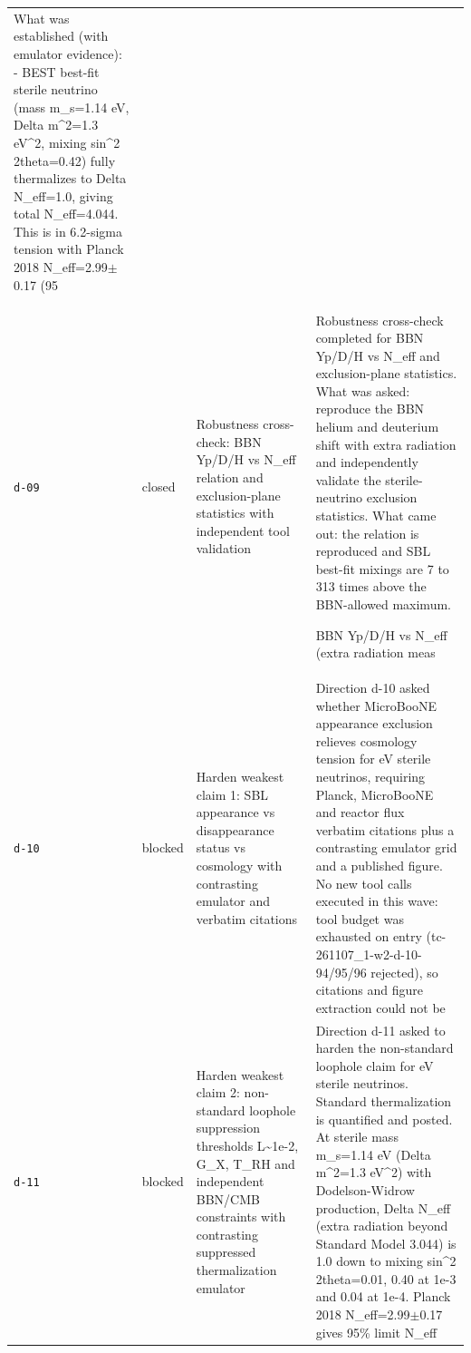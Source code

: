 \documentclass[11pt,a4paper]{article}
\begin{document}
\begin{longtable}{@{}p{}p{}p{}p{}@{}}
What was established (with emulator evidence):
- BEST best-fit sterile neutrino (mass m\_s=1.14 eV, Delta m\textasciicircum{}2=1.3 eV\textasciicircum{}2, mixing sin\textasciicircum{}2 2theta=0.42) fully thermalizes to Delta N\_eff=1.0, giving total N\_eff=4.044. This is in 6.2-sigma tension with Planck 2018 N\_eff=2.99$\pm$0.17 (95 \\
\texttt{d-09} & closed & Robustness cross-check: BBN Yp/D/H vs N\_eff relation and exclusion-plane statistics with independent tool validation & Robustness cross-check completed for BBN Yp/D/H vs N\_eff and exclusion-plane statistics. What was asked: reproduce the BBN helium and deuterium shift with extra radiation and independently validate the sterile-neutrino exclusion statistics. What came out: the relation is reproduced and SBL best-fit mixings are 7 to 313 times above the BBN-allowed maximum.

BBN Yp/D/H vs N\_eff (extra radiation meas \\
\texttt{d-10} & blocked & Harden weakest claim 1: SBL appearance vs disappearance status vs cosmology with contrasting emulator and verbatim citations & Direction d-10 asked whether MicroBooNE appearance exclusion relieves cosmology tension for eV sterile neutrinos, requiring Planck, MicroBooNE and reactor flux verbatim citations plus a contrasting emulator grid and a published figure. No new tool calls executed in this wave: tool budget was exhausted on entry (tc-261107\_1-w2-d-10-94/95/96 rejected), so citations and figure extraction could not be \\
\texttt{d-11} & blocked & Harden weakest claim 2: non-standard loophole suppression thresholds L\textasciitilde{}1e-2, G\_X, T\_RH and independent BBN/CMB constraints with contrasting suppressed thermalization emulator & Direction d-11 asked to harden the non-standard loophole claim for eV sterile neutrinos. Standard thermalization is quantified and posted. At sterile mass m\_s=1.14 eV (Delta m\textasciicircum{}2=1.3 eV\textasciicircum{}2) with Dodelson-Widrow production, Delta N\_eff (extra radiation beyond Standard Model 3.044) is 1.0 down to mixing sin\textasciicircum{}2 2theta=0.01, 0.40 at 1e-3 and 0.04 at 1e-4. Planck 2018 N\_eff=2.99$\pm$0.17 gives 95\% limit N\_eff \\
\bottomrule\end{longtable}
\end{document}
